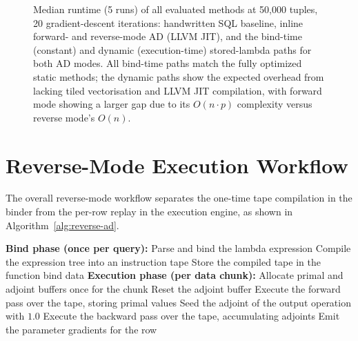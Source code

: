 \documentclass[12pt]{report}
\begin{document}
\begin{figure}[H]
\centering
{}
\caption{Median runtime (5 runs) of all evaluated methods at 50{,}000
tuples, 20 gradient-descent iterations: handwritten SQL baseline,
inline forward- and reverse-mode AD (LLVM JIT), and the bind-time
(constant) and dynamic (execution-time) stored-lambda paths for both AD
modes. All bind-time paths match the fully optimized static methods; the
dynamic paths show the expected overhead from lacking tiled vectorisation
and LLVM JIT compilation, with forward mode showing a larger gap due to
its $O(n \cdot p)$ complexity versus reverse mode's $O(n)$.}
\label{fig:stored_lambda_bench}
\end{figure}

\section{Reverse-Mode Execution Workflow}

The overall reverse-mode workflow separates the one-time tape compilation in the binder from the per-row replay in the execution engine, as shown in Algorithm~\ref{alg:reverse-ad}.

\begin{algorithm}
\caption{Reverse-Mode AD with Bind-Time Tape Reuse}
\label{alg:reverse-ad}
\begin{algorithmic}
\State \textbf{Bind phase (once per query):}
\State \quad Parse and bind the lambda expression
\State \quad Compile the expression tree into an instruction tape
\State \quad Store the compiled tape in the function bind data
\State \textbf{Execution phase (per data chunk):}
\State \quad Allocate primal and adjoint buffers once for the chunk
    \State Reset the adjoint buffer
    \State Execute the forward pass over the tape, storing primal values
    \State Seed the adjoint of the output operation with $1.0$
    \State Execute the backward pass over the tape, accumulating adjoints
    \State Emit the parameter gradients for the row
\EndFor
\end{algorithmic}
\end{algorithm}
\end{document}
